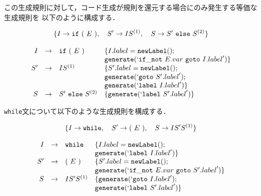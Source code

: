 \documentclass[dvipdfmx,a4j]{jbook}
\begin{document}
この生成規則に対して，コード生成が規則を還元する場合にのみ発生する等価な生成規則を
以下のように構成する．

\[\{I\rightarrow \texttt{if}\ \ttlp\ E\ \ttrp,\quad
    S'\rightarrow IS^{(1)},\quad
    S\rightarrow S'\ \texttt{else}\ S^{(2)}\}\]

\[\begin{array}{rcll}
        I  & \rightarrow                  & \texttt{if}\ \ttlp\ E\ \ttrp
           & \{I.label=\newLabelnull();                                                                    \\
           &                              &                              & \generateifnot{E.var}{I.label}\} \\
        S' & \rightarrow                  & IS^{(1)}
           & \{S'.label=\newLabelnull();                                                                   \\
           &                              &                              & \generategoto{S'.label};         \\
           &                              &                              & \generatelabel{I.label}\}        \\
        S  & \rightarrow                  & S'\ \texttt{else}\ S^{(2)}   &
        \{\generatelabel{S'.label}\}
    \end{array}\]

\vspace*{10pt}

{\tt while}文について以下のような生成規則を構成する．

\[\{I\rightarrow{\tt while},\quad S'\rightarrow{\tt (}\ E\ {\tt )},\quad
    S\rightarrow IS'S^{(1)}\}\]

\[\begin{array}{rcll}
        I  & \rightarrow & \texttt{while}\  & \{I.label={\tt newLabel}();       \\
           &             &                  & {\tt generate(`label\ }{I.label}')\}         \\
        S' & \rightarrow & {\tt (}\ E\ {\tt )}  & \{S'.label={\tt newLabel}();      \\
           &             &                  & {\tt generate}(`{\tt if\_not}\ {E.var}\ {\tt goto}\ {S'.label}')\} \\
        S  & \rightarrow & IS'S^{(1)}       & \{{\tt generate(`goto\ }{I.label}');         \\
           &             &                  & {\tt generate(`label\ }{S'.label}')\}
    \end{array}\]
\end{document}
